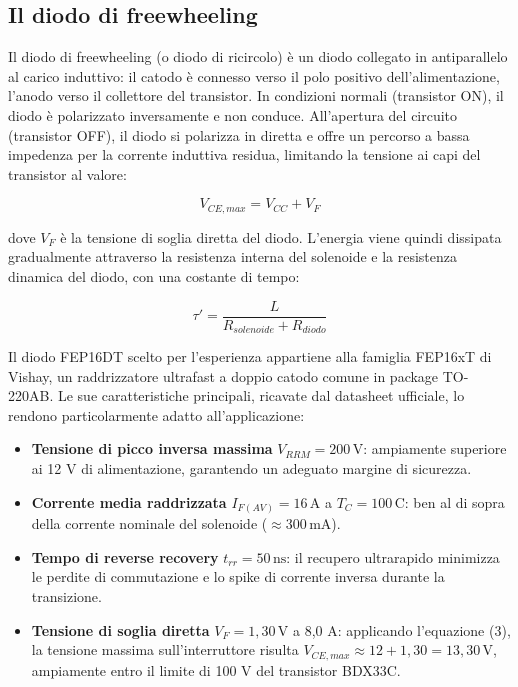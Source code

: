 \documentclass{article}
\begin{document}
    \subsection{Il diodo di freewheeling}
        Il diodo di freewheeling (o diodo di ricircolo) è un diodo collegato in antiparallelo al carico induttivo: il catodo è connesso verso
        il polo positivo dell'alimentazione, l'anodo verso il collettore del transistor. In condizioni normali (transistor ON), il diodo è
        polarizzato inversamente e non conduce. All'apertura del circuito (transistor OFF), il diodo si polarizza in diretta e offre un percorso
        a bassa impedenza per la corrente induttiva residua, limitando la tensione ai capi del transistor al valore:
        
        \begin{equation}
            \boxed{V_{CE,max} = V_{CC} + V_F}
        \end{equation}
        
        \noindent dove $V_F$ è la tensione di soglia diretta del diodo. L'energia viene quindi dissipata gradualmente attraverso la resistenza interna
        del solenoide e la resistenza dinamica del diodo, con una costante di tempo:
        
        \begin{equation}
            \boxed{\tau' = \frac{L}{R_{solenoide} + R_{diodo}}}
        \end{equation}
        
        \noindent Il diodo FEP16DT scelto per l'esperienza appartiene alla famiglia FEP16xT di Vishay, un raddrizzatore ultrafast a doppio catodo comune in
        package TO-220AB. Le sue caratteristiche principali, ricavate dal datasheet ufficiale, lo rendono particolarmente adatto all'applicazione:
        
        \begin{itemize}
            \item \textbf{Tensione di picco inversa massima} $V_{RRM} = 200\,\text{V}$: ampiamente superiore ai 12 V di alimentazione, garantendo un adeguato margine di sicurezza.
            \item \textbf{Corrente media raddrizzata} $I_{F(AV)} = 16\,\text{A}$ a $T_C = 100\,\text{C}$: ben al di sopra della corrente nominale del solenoide ($\approx 300\,\text{mA}$).
            \item \textbf{Tempo di reverse recovery} $t_{rr} = 50\,\text{ns}$: il recupero ultrarapido minimizza le perdite di commutazione e lo spike di corrente inversa durante la transizione.
            \item \textbf{Tensione di soglia diretta} $V_F = 1{,}30\,\text{V}$ a 8,0 A: applicando l'equazione (3), la tensione massima sull'interruttore risulta $V_{CE,max} \approx 12 + 1{,}30 = 13{,}30\,\text{V}$, ampiamente entro il limite di 100 V del transistor BDX33C.
        \end{itemize}
\newpage
\end{document}
